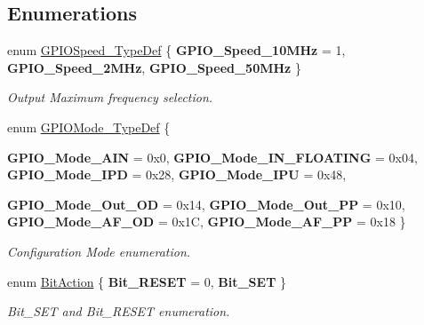 \subsection*{Enumerations}
\begin{DoxyCompactItemize}
\item 
enum \hyperlink{group__GPIO__Exported__Types_ga062ad92b67b4a1f301c161022cf3ba8e}{GPIOSpeed\_\-TypeDef} \{ {\bfseries GPIO\_\-Speed\_\-10MHz} =  1, 
{\bfseries GPIO\_\-Speed\_\-2MHz}, 
{\bfseries GPIO\_\-Speed\_\-50MHz}
 \}
\begin{DoxyCompactList}\small\item\em Output Maximum frequency selection. \item\end{DoxyCompactList}\item 
enum \hyperlink{group__GPIO__Exported__Types_ga1347339e1c84a196fabbb31205eec5d4}{GPIOMode\_\-TypeDef} \{ \par
{\bfseries GPIO\_\-Mode\_\-AIN} =  0x0, 
{\bfseries GPIO\_\-Mode\_\-IN\_\-FLOATING} =  0x04, 
{\bfseries GPIO\_\-Mode\_\-IPD} =  0x28, 
{\bfseries GPIO\_\-Mode\_\-IPU} =  0x48, 
\par
{\bfseries GPIO\_\-Mode\_\-Out\_\-OD} =  0x14, 
{\bfseries GPIO\_\-Mode\_\-Out\_\-PP} =  0x10, 
{\bfseries GPIO\_\-Mode\_\-AF\_\-OD} =  0x1C, 
{\bfseries GPIO\_\-Mode\_\-AF\_\-PP} =  0x18
 \}
\begin{DoxyCompactList}\small\item\em Configuration Mode enumeration. \item\end{DoxyCompactList}\item 
enum \hyperlink{group__GPIO__Exported__Types_ga176130b21c0e719121470a6042d4cf19}{BitAction} \{ {\bfseries Bit\_\-RESET} =  0, 
{\bfseries Bit\_\-SET}
 \}
\begin{DoxyCompactList}\small\item\em Bit\_\-SET and Bit\_\-RESET enumeration. \item\end{DoxyCompactList}\end{DoxyCompactItemize}


